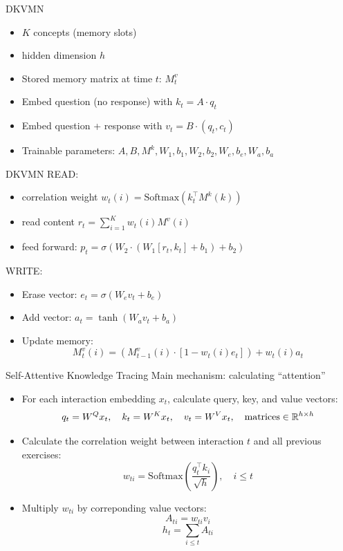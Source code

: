 \documentclass{beamer}
\def \R{\ensuremath \mathbb{R}}
\theoremstyle{definition}
\begin{document}
\begin{frame}{DKVMN}
  \begin{itemize}
    \item $K$ concepts (memory slots)
    \item hidden dimension $h$
    \item Stored memory matrix at time $t$: $M_t^v$
    \item Embed question (no response) with $k_t = A\cdot q_t$
    \item Embed question + response with $v_t = B\cdot (q_t,c_t)$
    \item Trainable parameters: $A,B, M^k, W_1, b_1, W_2, b_2, W_e, b_e, W_a, b_a$ 
  \end{itemize}
\end{frame}

\begin{frame}{DKVMN}
READ:
\begin{itemize}
  \item correlation weight $w_t(i) =  \text{Softmax}(k_t^\top M^k(k))$
  \item read content $r_t = \sum_{i=1}^K w_t(i) M^v(i)$
  \item feed forward: $p_t = \sigma(W_2\cdot \left( W_1[r_t, k_t] + b_1 \right) + b_2)$
\end{itemize}
WRITE:
\begin{itemize}
  \item Erase vector: $e_t = \sigma(W_e v_t + b_e)$
  \item Add vector: $a_t  = \tanh(W_a v_t + b_a)$
  \item Update memory:\[M_t^v(i) = \left( M_{t-1}^v(i) \cdot [1 - w_t(i) e_t] \right) + w_t(i) a_t\]
\end{itemize}
\end{frame}

\begin{frame}{Self-Attentive Knowledge Tracing}
Main mechanism: calculating ``attention''
  \begin{itemize}
    \item For each interaction embedding $x_t$, calculate query, key, and value vectors:
      \[q_t = W^Q x_t, \quad k_t = W^K x_t, \quad v_t = W^V x_t, \quad \text{matrices}\in \R^{h \times h}\]
    \item Calculate the correlation weight between interaction $t$ and all previous exercises:
      \[w_{ti} = \text{Softmax} \left(\frac{q_t^\top k_i}{\sqrt{h}}\right), \quad i \leq t\]
    \item Multiply $w_{ti}$ by correponding value vectors:
      \[A_{ti} = w_{ti} v_i\]
      \[h_t = \sum_{i \leq t} A_{ti}\]
  \end{itemize}
\end{frame}
\end{document}
